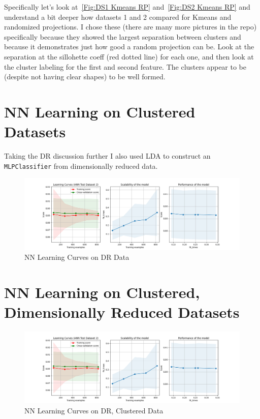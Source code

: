 \documentclass[11pt]{article}
\begin{document}
    Specifically let's look at~\ref{Fig:DS1 Kmeans RP} and~\ref{Fig:DS2 Kmeans RP} and understand a bit deeper how datasets 1 and 2 compared for Kmeans and randomized projections.
    I chose these (there are many more pictures in the repo) specifically because they showed the largest separation between
    clusters and because it demonstrates just how good a random projection can be.
    Look at the separation at the sillohette coeff (red dotted line) for each one, and then look at the cluster labeling
    for the first and second feature.
    The clusters appear to be (despite not having clear shapes) to be well formed.

    \section{NN Learning on Clustered Datasets}\label{sec:nn-learning-on-clustered-datasets}
    Taking the DR discussion further I also used LDA to construct an \texttt{MLPClassifier} from dimensionally reduced data.

    \begin{figure}
        \centering
        \includegraphics[width=.9\linewidth]{ann1.png}
        \caption{NN Learning Curves on DR Data}\label{Fig:NN Learning Curves on DR Data}
    \end{figure}


    \section{NN Learning on Clustered, Dimensionally Reduced Datasets}\label{sec:nn-learning-on-clustered,-dimensionally-reduced-datasets}
    \begin{figure}
        \centering
        \includegraphics[width=.9\linewidth]{ann1.png}
        \caption{NN Learning Curves on DR, Clustered Data}\label{Fig:NN Learning Curves on DR, Clustered Data}
    \end{figure}

    
    
\end{document}
